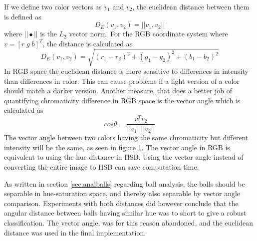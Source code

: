 If we define two color vectors as $v_{1}$ and $v_{2}$, the euclidean distance between them is defined as
\begin{equation}
D_{E}(v_{1}, v_{2}) = ||v_{1}, v_{2}||
\end{equation}
where $||\bullet||$ is the $L_{2}$ vector norm. For the RGB coordinate system where $v = [r\;g\;b]^{T}$, the distance is calculated as
\begin{equation}
D_{E}(v_{1}, v_{2}) = \sqrt{(r_{1} - r_{2})^{2} + (g_{1} - g_{2})^{2} + (b_{1} - b_{2})^{2}}
\end{equation}
In RGB space the euclidean distance is more sensitive to differences in intensity than differences in color. This can cause problems if a light version of a color should match a darker version. Another measure, that does a better job of quantifying chromaticity difference in RGB space is the vector angle which is calculated as
\begin{equation}
cos \theta = \frac{v_{1}^ Tv_{2}}{||v_{1}|| ||v_{2}||}
\end{equation}
The vector angle between two colors having the same chromaticity but different intensity will be the same, as seen in figure \ref{fig:angleVersusEuclidean}. The vector angle in RGB is equivalent to using the hue distance in HSB. Using the vector angle instead of converting the entire image to HSB can save computation time.\cite{angleVsEuclidean}
\begin{figure}[H]
  \centering
  \quad           
\label{fig:angleVersusEuclidean}
\end{figure}
As written in section \ref{sec:analballs} regarding ball analysis, the balls should be separable in hue-saturation space, and thereby also separable by vector angle comparison. Experiments with both distances did however conclude that the angular distance between balls having similar hue was to short to give a robust classification. The vector angle, was for this reason abandoned, and the euclidean distance was used in the final implementation.

